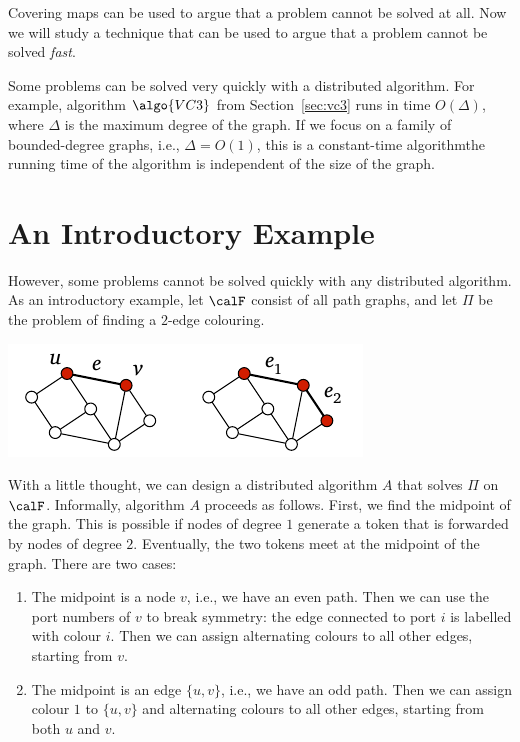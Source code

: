 
Covering maps can be used to argue that a problem cannot be solved at all. Now we will study a technique that can be used to argue that a problem cannot be solved \emph{fast}.

Some problems can be solved very quickly with a distributed algorithm. For example, algorithm $\algo{VC3}$ from Section~\ref{sec:vc3} runs in time $O(\Delta)$, where $\Delta$ is the maximum degree of the graph. If we focus on a family of bounded-degree graphs, i.e., $\Delta = O(1)$, this is a constant-time algorithm\mydash the running time of the algorithm is independent of the size of the graph.

\section{An Introductory Example}\label{sec:local-neighbourhood-example}

However, some problems cannot be solved quickly with any distributed algorithm. As an introductory example, let $\calF$ consist of all path graphs, and let $\Pi$ be the problem of finding a $2$-edge colouring.
\begin{center}
    \includegraphics[page=\PTwoEdgeCol]{figs.pdf}
\end{center}

With a little thought, we can design a distributed algorithm $A$ that solves $\Pi$ on $\calF$. Informally, algorithm $A$ proceeds as follows. First, we find the midpoint of the graph. This is possible if nodes of degree $1$ generate a token that is forwarded by nodes of degree $2$. Eventually, the two tokens meet at the midpoint of the graph. There are two cases:
\begin{enumerate}
    \item The midpoint is a node $v$, i.e., we have an even path. Then we can use the port numbers of $v$ to break symmetry: the edge connected to port $i$ is labelled with colour $i$. Then we can assign alternating colours to all other edges, starting from $v$.
    \item The midpoint is an edge $\{u,v\}$, i.e., we have an odd path. Then we can assign colour $1$ to $\{u,v\}$ and alternating colours to all other edges, starting from both $u$ and $v$.
\end{enumerate}

